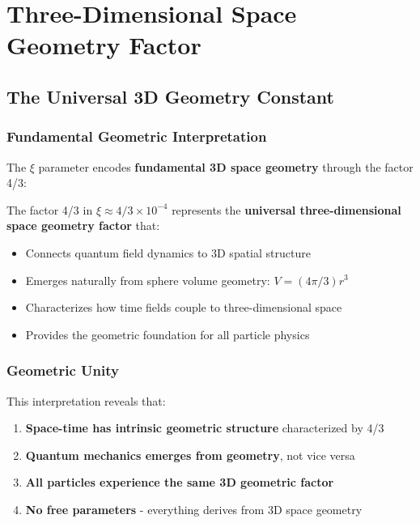 	\section{Three-Dimensional Space Geometry Factor}
	\label{sec:3d_geometry_factor}
	
	\subsection{The Universal 3D Geometry Constant}
	\label{subsec:universal_3d_constant}
	
	\subsubsection{Fundamental Geometric Interpretation}
	\label{subsubsec:fundamental_interpretation}
	
	The $\xi$ parameter encodes \textbf{fundamental 3D space geometry} through the factor 4/3:
	
	\begin{tcolorbox}[colback=yellow!5!white,colframe=orange!75!black,title=Three-Dimensional Space Geometry Factor]
		The factor 4/3 in $\xi \approx 4/3 \times 10^{-4}$ represents the \textbf{universal three-dimensional space geometry factor} that:
		\begin{itemize}
			\item Connects quantum field dynamics to 3D spatial structure
			\item Emerges naturally from sphere volume geometry: $V = (4\pi/3)r^3$
			\item Characterizes how time fields couple to three-dimensional space
			\item Provides the geometric foundation for all particle physics
		\end{itemize}
	\end{tcolorbox}
	
	\subsubsection{Geometric Unity}
	\label{subsubsec:geometric_unity}
	
	This interpretation reveals that:
	\begin{enumerate}
		\item \textbf{Space-time has intrinsic geometric structure} characterized by 4/3
		\item \textbf{Quantum mechanics emerges from geometry}, not vice versa
		\item \textbf{All particles experience the same 3D geometric factor}
		\item \textbf{No free parameters} - everything derives from 3D space geometry
	\end{enumerate}
	
